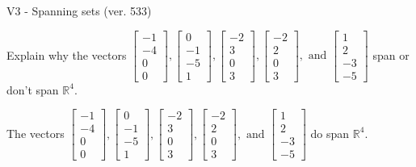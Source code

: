 \begin{exercise}
  \begin{exerciseTitle}V3 - Spanning sets (ver. 533)\end{exerciseTitle}
  \begin{exerciseStatement}
    Explain why the vectors \(\left[\begin{array}{r}
-1 \\
-4 \\
0 \\
0
\end{array}\right] , \left[\begin{array}{r}
0 \\
-1 \\
-5 \\
1
\end{array}\right] , \left[\begin{array}{r}
-2 \\
3 \\
0 \\
3
\end{array}\right] , \left[\begin{array}{r}
-2 \\
2 \\
0 \\
3
\end{array}\right] , \text{ and } \left[\begin{array}{r}
1 \\
2 \\
-3 \\
-5
\end{array}\right]\) span or don't span \(\mathbb{R}^4\). 
	


  \end{exerciseStatement}
  \begin{exerciseAnswer}
   The vectors \(\left[\begin{array}{r}
-1 \\
-4 \\
0 \\
0
\end{array}\right] , \left[\begin{array}{r}
0 \\
-1 \\
-5 \\
1
\end{array}\right] , \left[\begin{array}{r}
-2 \\
3 \\
0 \\
3
\end{array}\right] , \left[\begin{array}{r}
-2 \\
2 \\
0 \\
3
\end{array}\right] , \text{ and } \left[\begin{array}{r}
1 \\
2 \\
-3 \\
-5
\end{array}\right]\) 
  	 do  
	span \(\mathbb{R}^4\).
  



\end{exerciseAnswer}
\end{exercise}
